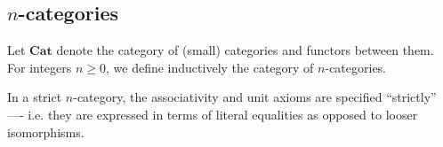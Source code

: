 























\subsection{$n$-categories}

\begin{notation}
Let $\mathbf{Cat}$ denote the category of (small) categories and functors between them.  
For integers $n \ge 0$, we define inductively the category of $n$-categories.  
\end{notation}

In a strict $n$-category, the associativity and unit axioms are specified ``strictly'' ---- i.e. they are expressed in terms of literal equalities as opposed to looser isomorphisms.








